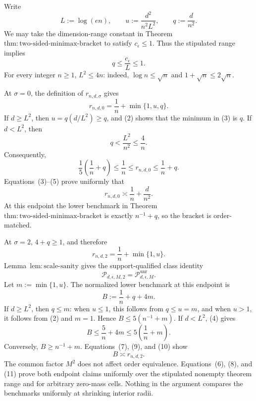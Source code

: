 Write
\[
 L:=\log(en),\qquad
 u:=\frac{d^2}{n^2L^2},\qquad
 q:=\frac d{n^2}.
\tag{1}
\]
We may take the dimension-range constant in Theorem~\(\mathrm{thm:two\text{-}sided\text{-}minimax\text{-}bracket}\) to satisfy \(c_{\epsilon}\le1\).  Thus the stipulated range implies
\[
 q\le\frac{c_{\epsilon}}L\le1.
\tag{2}
\]
For every integer \(n\ge1\), \(L^2\le4n\): indeed, \(\log n\le\sqrt n\) and \(1+\sqrt n\le2\sqrt n\).

At \(\sigma=0\), the definition of \(r_{n,d,\sigma}\) gives
\[
 r_{n,d,0}=\frac1n+\min\{1,u,q\}.
\tag{3}
\]
If \(d\ge L^2\), then \(u=q(d/L^2)\ge q\), and (2) shows that the minimum in (3) is \(q\).  If \(d<L^2\), then
\[
 q<\frac{L^2}{n^2}\le\frac4n.
\tag{4}
\]
Consequently,
\[
 \frac15\left(\frac1n+q\right)
 \le \frac1n
 \le r_{n,d,0}
 \le \frac1n+q.
\tag{5}
\]
Equations~(3)--(5) prove uniformly that
\[
 r_{n,d,0}\asymp \frac1n+\frac d{n^2}.
\tag{6}
\]
At this endpoint the lower benchmark in Theorem~\(\mathrm{thm:two\text{-}sided\text{-}minimax\text{-}bracket}\) is exactly \(n^{-1}+q\), so the bracket is order-matched.

At \(\sigma=2\), \(4+q\ge1\), and therefore
\[
 r_{n,d,2}=\frac1n+\min\{1,u\}.
\tag{7}
\]
Lemma~\(\mathrm{lem:scale\text{-}sanity}\) gives the support-qualified class identity
\[
 \mathcal P_{d,\epsilon,M,2}=\mathcal P_{d,\epsilon,M}^{\mathrm{unr}}.
\tag{8}
\]
Let \(m:=\min\{1,u\}\).  The normalized lower benchmark at this endpoint is
\[
 B:=\frac1n+q+4m.
\tag{9}
\]
If \(d\ge L^2\), then \(q\le m\): when \(u\le1\), this follows from \(q\le u=m\), and when \(u>1\), it follows from (2) and \(m=1\).  Hence \(B\le5(n^{-1}+m)\).  If \(d<L^2\), (4) gives
\[
 B\le\frac5n+4m\le5\left(\frac1n+m\right).
\tag{10}
\]
Conversely, \(B\ge n^{-1}+m\).  Equations~(7), (9), and (10) show
\[
 B\asymp r_{n,d,2}.
\tag{11}
\]
The common factor \(M^2\) does not affect order equivalence.  Equations~(6), (8), and (11) prove both endpoint claims uniformly over the stipulated nonempty theorem range and for arbitrary zero-mass cells.  Nothing in the argument compares the benchmarks uniformly at shrinking interior radii.